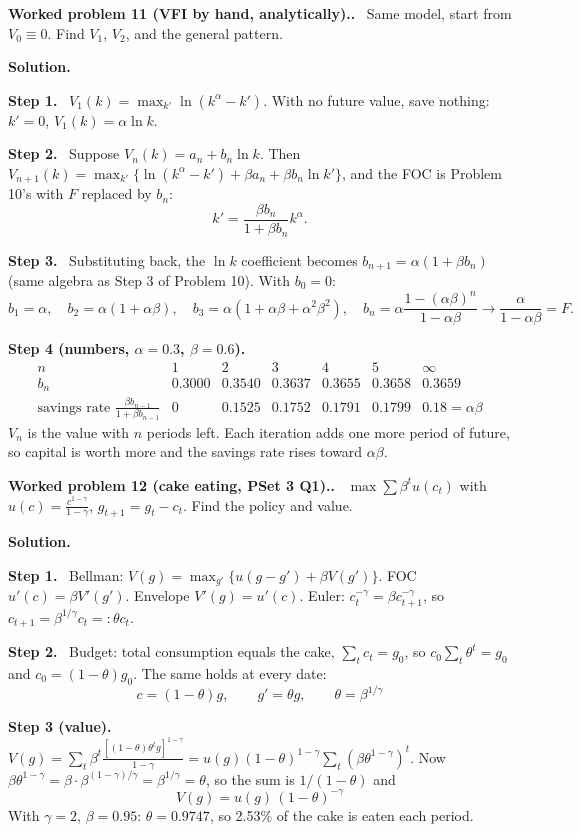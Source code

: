 \documentclass[12pt]{article}
\newcommand{\st}[1]{\par\smallskip\textbf{Step #1.}\ }
\newcommand{\ans}[1]{\[\boxed{\ #1\ }\]}
\newcommand{\prob}[1]{\par\bigskip\textbf{Worked problem #1.}\ }
\newcommand{\sol}{\par\smallskip\textbf{Solution.}\par}
\begin{document}
\prob{11 (VFI by hand, analytically).} Same model, start from $V_0\equiv0$. Find $V_1$, $V_2$, and the general pattern.
\sol
\st{1} $V_1(k)=\max_{k'}\ln(k^\alpha-k')$. With no future value, save nothing: $k'=0$, $V_1(k)=\alpha\ln k$.
\st{2} Suppose $V_n(k)=a_n+b_n\ln k$. Then $V_{n+1}(k)=\max_{k'}\{\ln(k^\alpha-k')+\beta a_n+\beta b_n\ln k'\}$, and the FOC is Problem 10's with $F$ replaced by $b_n$:
\[
k'=\frac{\beta b_n}{1+\beta b_n}k^\alpha .
\]
\st{3} Substituting back, the $\ln k$ coefficient becomes $b_{n+1}=\alpha(1+\beta b_n)$ (same algebra as Step 3 of Problem 10). With $b_0=0$:
\[
b_1=\alpha,\quad b_2=\alpha(1+\alpha\beta),\quad b_3=\alpha(1+\alpha\beta+\alpha^2\beta^2),\quad b_n=\alpha\frac{1-(\alpha\beta)^n}{1-\alpha\beta}\to\frac{\alpha}{1-\alpha\beta}=F .
\]
\st{4 (numbers, $\alpha=0.3$, $\beta=0.6$)}
\[
\begin{array}{c|ccccc|c}
n&1&2&3&4&5&\infty\\\hline
b_n&0.3000&0.3540&0.3637&0.3655&0.3658&0.3659\\
\text{savings rate }\frac{\beta b_{n-1}}{1+\beta b_{n-1}}&0&0.1525&0.1752&0.1791&0.1799&0.18=\alpha\beta
\end{array}
\]
$V_n$ is the value with $n$ periods left. Each iteration adds one more period of future, so capital is worth more and the savings rate rises toward $\alpha\beta$.

\prob{12 (cake eating, PSet 3 Q1).} $\max\sum\beta^tu(c_t)$ with $u(c)=\frac{c^{1-\gamma}}{1-\gamma}$, $g_{t+1}=g_t-c_t$. Find the policy and value.
\sol
\st{1} Bellman: $V(g)=\max_{g'}\{u(g-g')+\beta V(g')\}$. FOC $u'(c)=\beta V'(g')$. Envelope $V'(g)=u'(c)$. Euler: $c_t^{-\gamma}=\beta c_{t+1}^{-\gamma}$, so $c_{t+1}=\beta^{1/\gamma}c_t=:\theta c_t$.
\st{2} Budget: total consumption equals the cake, $\sum_tc_t=g_0$, so $c_0\sum_t\theta^t=g_0$ and $c_0=(1-\theta)g_0$. The same holds at every date:
\ans{c=(1-\theta)g,\qquad g'=\theta g,\qquad\theta=\beta^{1/\gamma}}
\st{3 (value)} $V(g)=\sum_t\beta^t\frac{[(1-\theta)\theta^tg]^{1-\gamma}}{1-\gamma}=u(g)(1-\theta)^{1-\gamma}\sum_t(\beta\theta^{1-\gamma})^t$.
Now $\beta\theta^{1-\gamma}=\beta\cdot\beta^{(1-\gamma)/\gamma}=\beta^{1/\gamma}=\theta$, so the sum is $1/(1-\theta)$ and
\ans{V(g)=u(g)\,(1-\theta)^{-\gamma}}
With $\gamma=2$, $\beta=0.95$: $\theta=0.9747$, so 2.53\% of the cake is eaten each period.
\end{document}
